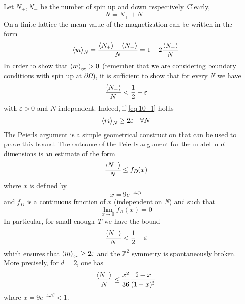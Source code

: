 \documentclass[../../Main/Main.tex]{subfiles}
\begin{document}
Let \( N_+,N_- \) be the number of spin up and down respectively. Clearly,
\begin{equation*}
  N=N_+ + N_-  
\end{equation*}
On a finite lattice the mean value of the magnetization can be written in the form 
\begin{equation*}
  \expval{m}_N = \frac{\expval{N_+} - \expval{N_-}  }{N} = 1 - 2 \frac{\expval{N_-} }{N}
\end{equation*}
In order to show that \( \expval{m}_ \infty >0  \) (remember that we are considering boundary conditions with spin up at \( \partial{\Omega }  \)), it is sufficient to show that for every \(N\) we have 
\begin{equation}
  \frac{\expval{N_-} }{N}  < \frac{1}{2}- \varepsilon
  \label{eq:10_1}
\end{equation}
with \( \varepsilon >0 \) and \(N\)-independent.
Indeed, if \eqref{eq:10_1} holds
\begin{equation}
  \expval{m}_N \ge 2 \varepsilon \quad \forall N
\end{equation}
The Peierls argument is a simple geometrical construction that can be used to prove this
bound.
The outcome of the Peierls argument for the model in \(d\) dimensions is an estimate of the form
\begin{equation}
  \frac{\expval{N_-} }{N} \le f_D (x)
\end{equation}
where \(x\) is defined by 
\begin{equation}
  x = 9 e^{-4J \beta } 
\end{equation}
and \( f_D \) is a continuous function of \( x \) (independent on \emph{N}) and such that 
\begin{equation*}
\lim_{x \rightarrow 0} f_D (x) = 0    
\end{equation*}
In particular, for small enough \emph{T} we have the bound
\begin{equation*}
  \frac{\expval{N_-} }{N} < \frac{1}{2} - \varepsilon
\end{equation*}
which ensures that \(\expval{m}_\infty \ge 2\varepsilon  \) and the \(\mathbb{Z}^2\) symmetry is spontaneously broken.
More precisely, for \(d=2\), one has
\begin{equation}
    \frac{\expval{N_-} }{N} \le \frac{x^2}{36} \frac{2-x}{(1-x)^2}
\end{equation}
where \(   x = 9 e^{-4J \beta } < 1 \).
\end{document}
